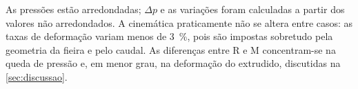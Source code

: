 As pressões estão arredondadas; $\Delta p$ e as variações foram calculadas a partir dos valores não arredondados. A cinemática praticamente não se altera entre casos: as taxas de deformação variam menos de \qty{3}{\percent}, pois são impostas sobretudo pela geometria da fieira e pelo caudal. As diferenças entre R e M concentram-se na queda de pressão e, em menor grau, na deformação do extrudido, discutidas na \autoref{sec:discussao}.
